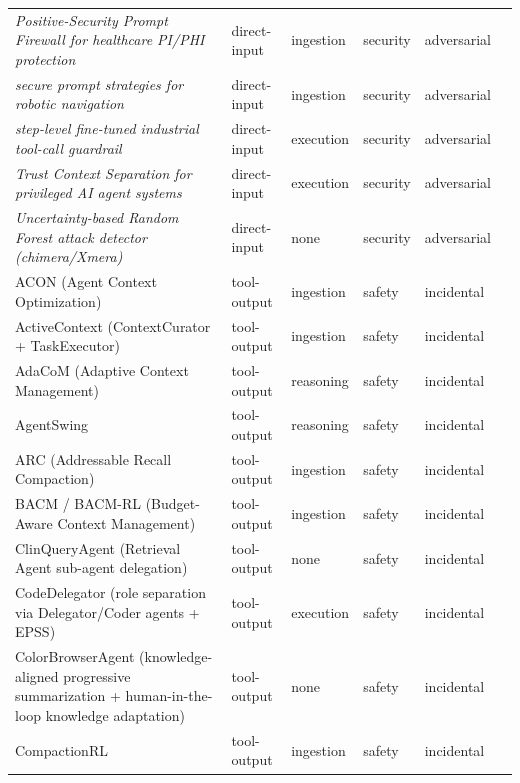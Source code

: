 \begin{longtable}{@{}p{}lllll@{}}
\emph{Positive-Security Prompt Firewall for healthcare PI/PHI protection} & direct-input & ingestion & security & adversarial & \cite{schwoebel-2026-injection} \\
\emph{secure prompt strategies for robotic navigation} & direct-input & ingestion & security & adversarial & \cite{zhang-2024-study} \\
\emph{step-level fine-tuned industrial tool-call guardrail} & direct-input & execution & security & adversarial & \cite{xue-2026-multiagent} \\
\emph{Trust Context Separation for privileged AI agent systems} & direct-input & execution & security & adversarial & \cite{singh-2026-securingb} \\
\emph{Uncertainty-based Random Forest attack detector (chimera/Xmera)} & direct-input & none & security & adversarial & \cite{fastowski-2025-injecting} \\
ACON (Agent Context Optimization) & tool-output & ingestion & safety & incidental & \cite{kang-2025-acon} \\
ActiveContext (ContextCurator + TaskExecutor) & tool-output & ingestion & safety & incidental & \cite{li-2026-escaping} \\
AdaCoM (Adaptive Context Management) & tool-output & reasoning & safety & incidental & \cite{yi-2026-learning} \\
AgentSwing & tool-output & reasoning & safety & incidental & \cite{feng-2026-agentswing} \\
ARC (Addressable Recall Compaction) & tool-output & ingestion & safety & incidental & \cite{dang-2026-addressable} \\
BACM / BACM-RL (Budget-Aware Context Management) & tool-output & ingestion & safety & incidental & \cite{wu-2026-contextbudget} \\
ClinQueryAgent (Retrieval Agent sub-agent delegation) & tool-output & none & safety & incidental & \cite{boyle-2026-clinqueryagent} \\
CodeDelegator (role separation via Delegator/Coder agents + EPSS) & tool-output & execution & safety & incidental & \cite{fei-2026-codedelegator} \\
ColorBrowserAgent (knowledge-aligned progressive summarization + human-in-the-loop knowledge adaptation) & tool-output & none & safety & incidental & \cite{wang-2026-colorbrowseragent} \\
CompactionRL & tool-output & ingestion & safety & incidental & \cite{li-2026-compactionrl} \\

\end{longtable}
